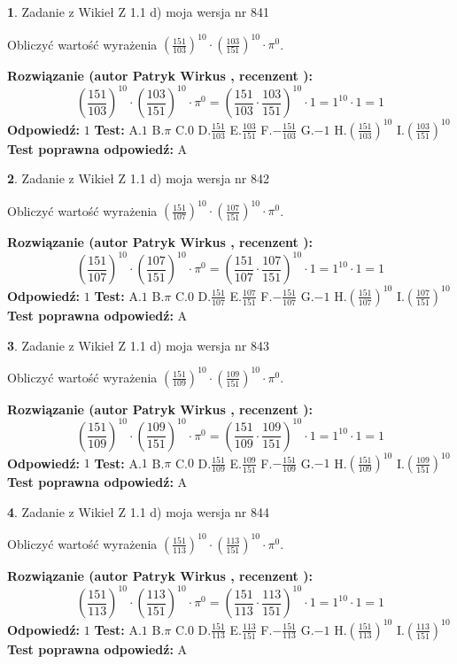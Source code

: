 \documentclass[12pt, a4paper]{article}
\theoremstyle{definition} %
\newtheorem{zad}{}
\newcommand{\zadStart}[1]{\begin{zad}#1\newline}
\newcommand{\zadStop}{\end{zad}}
\newcommand{\rozwStart}[2]{\noindent \textbf{Rozwiązanie (autor #1 , recenzent #2): }\newline}
\newcommand{\rozwStop}{\newline}
\newcommand{\odpStart}{\noindent \textbf{Odpowiedź:}\newline}
\newcommand{\odpStop}{\newline}
\newcommand{\testStart}{\noindent \textbf{Test:}\newline}
\newcommand{\testStop}{\newline}
\newcommand{\kluczStart}{\noindent \textbf{Test poprawna odpowiedź:}\newline}
\newcommand{\kluczStop}{\newline}
\begin{document}
\zadStart{Zadanie z Wikieł Z 1.1 d) moja wersja nr 841}

Obliczyć wartość wyrażenia $(\frac{151}{103})^{10} \cdot (\frac{103}{151})^{10} \cdot \pi^{0}$.
\zadStop
\rozwStart{Patryk Wirkus}{}
$$(\frac{151}{103})^{10} \cdot (\frac{103}{151})^{10} \cdot \pi^{0} = (\frac{151}{103} \cdot \frac{103}{151})^{10} \cdot 1 = 1^{10} \cdot 1 = 1$$
\rozwStop
\odpStart
$1$
\odpStop
\testStart
A.$1$ B.$\pi$ C.$0$ D.$\frac{151}{103}$ E.$\frac{103}{151}$
F.$-\frac{151}{103}$ G.$-1$
H.$(\frac{151}{103})^{10}$
I.$(\frac{103}{151})^{10}$
\testStop
\kluczStart
A
\kluczStop



\zadStart{Zadanie z Wikieł Z 1.1 d) moja wersja nr 842}

Obliczyć wartość wyrażenia $(\frac{151}{107})^{10} \cdot (\frac{107}{151})^{10} \cdot \pi^{0}$.
\zadStop
\rozwStart{Patryk Wirkus}{}
$$(\frac{151}{107})^{10} \cdot (\frac{107}{151})^{10} \cdot \pi^{0} = (\frac{151}{107} \cdot \frac{107}{151})^{10} \cdot 1 = 1^{10} \cdot 1 = 1$$
\rozwStop
\odpStart
$1$
\odpStop
\testStart
A.$1$ B.$\pi$ C.$0$ D.$\frac{151}{107}$ E.$\frac{107}{151}$
F.$-\frac{151}{107}$ G.$-1$
H.$(\frac{151}{107})^{10}$
I.$(\frac{107}{151})^{10}$
\testStop
\kluczStart
A
\kluczStop



\zadStart{Zadanie z Wikieł Z 1.1 d) moja wersja nr 843}

Obliczyć wartość wyrażenia $(\frac{151}{109})^{10} \cdot (\frac{109}{151})^{10} \cdot \pi^{0}$.
\zadStop
\rozwStart{Patryk Wirkus}{}
$$(\frac{151}{109})^{10} \cdot (\frac{109}{151})^{10} \cdot \pi^{0} = (\frac{151}{109} \cdot \frac{109}{151})^{10} \cdot 1 = 1^{10} \cdot 1 = 1$$
\rozwStop
\odpStart
$1$
\odpStop
\testStart
A.$1$ B.$\pi$ C.$0$ D.$\frac{151}{109}$ E.$\frac{109}{151}$
F.$-\frac{151}{109}$ G.$-1$
H.$(\frac{151}{109})^{10}$
I.$(\frac{109}{151})^{10}$
\testStop
\kluczStart
A
\kluczStop



\zadStart{Zadanie z Wikieł Z 1.1 d) moja wersja nr 844}

Obliczyć wartość wyrażenia $(\frac{151}{113})^{10} \cdot (\frac{113}{151})^{10} \cdot \pi^{0}$.
\zadStop
\rozwStart{Patryk Wirkus}{}
$$(\frac{151}{113})^{10} \cdot (\frac{113}{151})^{10} \cdot \pi^{0} = (\frac{151}{113} \cdot \frac{113}{151})^{10} \cdot 1 = 1^{10} \cdot 1 = 1$$
\rozwStop
\odpStart
$1$
\odpStop
\testStart
A.$1$ B.$\pi$ C.$0$ D.$\frac{151}{113}$ E.$\frac{113}{151}$
F.$-\frac{151}{113}$ G.$-1$
H.$(\frac{151}{113})^{10}$
I.$(\frac{113}{151})^{10}$
\testStop
\kluczStart
A
\kluczStop
\end{document}

